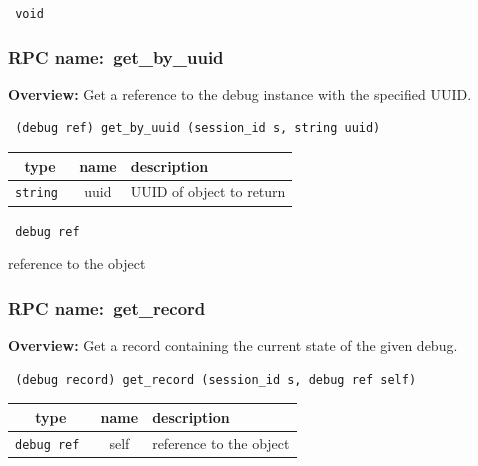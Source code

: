 {\tt 
void
}



\vspace{0.3cm}
\vspace{0.3cm}
\vspace{0.3cm}
\subsubsection{RPC name:~get\_by\_uuid}

{\bf Overview:} 
Get a reference to the debug instance with the specified UUID.

\begin{verbatim} (debug ref) get_by_uuid (session_id s, string uuid)\end{verbatim}



 
\vspace{0.3cm}
\begin{tabular}{|c|c|p{7cm}|}
 \hline
{\bf type} & {\bf name} & {\bf description} \\ \hline
{\tt string } & uuid & UUID of object to return \\ \hline 

\end{tabular}

\vspace{0.3cm}

{\tt 
debug ref
}


reference to the object
\vspace{0.3cm}
\vspace{0.3cm}
\vspace{0.3cm}
\subsubsection{RPC name:~get\_record}

{\bf Overview:} 
Get a record containing the current state of the given debug.

\begin{verbatim} (debug record) get_record (session_id s, debug ref self)\end{verbatim}



 
\vspace{0.3cm}
\begin{tabular}{|c|c|p{7cm}|}
 \hline
{\bf type} & {\bf name} & {\bf description} \\ \hline
{\tt debug ref } & self & reference to the object \\ \hline 

\end{tabular}

